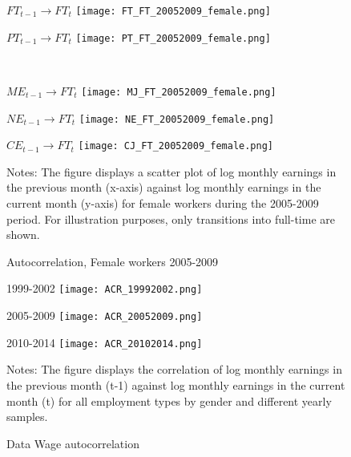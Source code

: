 \documentclass[12pt, a4paper]{article}
\begin{document}
\begin{figure}[!htbp]
\centering
\begin{minipage}[b]{0.48\textwidth}{$FT_{t-1}$$\rightarrow$$FT_{t}$}
\centering
\texttt{[image: FT\_FT\_20052009\_female.png]}
\end{minipage}
\begin{minipage}[b]{0.48\textwidth}{$PT_{t-1}$$\rightarrow$$FT_{t}$}
\centering
\texttt{[image: PT\_FT\_20052009\_female.png]}
\end{minipage}\\
\vspace{5mm}
\centering
\begin{minipage}[b]{0.32\textwidth}{$ME_{t-1}$$\rightarrow$$FT_{t}$}
\centering
\texttt{[image: MJ\_FT\_20052009\_female.png]}
\end{minipage}
\begin{minipage}[b]{0.32\textwidth}{$NE_{t-1}$$\rightarrow$$FT_{t}$}
\centering
\texttt{[image: NE\_FT\_20052009\_female.png]}
\end{minipage}
\begin{minipage}[b]{0.32\textwidth}{$CE_{t-1}$$\rightarrow$$FT_{t}$}
\centering
\texttt{[image: CJ\_FT\_20052009\_female.png]}
\end{minipage}
\footnotesize{
\justifying Notes: The figure displays a scatter plot of log monthly earnings in the previous month (x-axis) against log monthly earnings in the current month (y-axis) for female workers during the 2005-2009 period. For illustration purposes, only transitions into full-time are shown.\par}
\captionsetup{font=small,justification=raggedright}
\caption{Autocorrelation, Female workers 2005-2009}\label{fig:autocorrelation_female_20052009}
\end{figure}

\begin{figure}[!htbp]
\centering
\begin{minipage}[b]{0.32\textwidth}{1999-2002}
\centering
\texttt{[image: ACR\_19992002.png]}
\end{minipage}
\begin{minipage}[b]{0.32\textwidth}{2005-2009}
\centering
\texttt{[image: ACR\_20052009.png]}
\end{minipage}
\begin{minipage}[b]{0.32\textwidth}{2010-2014}
\centering
\texttt{[image: ACR\_20102014.png]}
\end{minipage}
\footnotesize{
\justifying Notes: The figure displays the correlation of log monthly earnings in the previous month (t-1) against log monthly earnings in the current month (t) for all employment types by gender and different yearly samples.\par}
\captionsetup{font=small,justification=raggedright}
\caption{Data Wage autocorrelation}\label{fig:autocorrelation_samples}
\end{figure}
\end{document}
